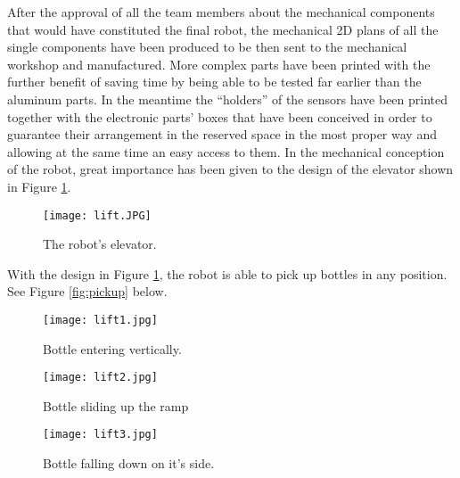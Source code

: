 After the approval of all the team members about the mechanical components that would have constituted the final robot, the mechanical 2D plans of all the single components have been produced to be then sent to the mechanical workshop and manufactured.
More complex parts have been printed with the further benefit of saving time by being able to be tested far earlier than the aluminum parts.
 In the meantime the “holders” of the sensors have been printed together with the electronic parts' boxes that have been conceived in order to guarantee their arrangement in the reserved space in the most proper way and allowing at the same time an easy access to them.
In the mechanical conception of the robot, great importance has been given to the design of the elevator shown in Figure \ref{fig:lift}.

\begin{figure}[H]
 \centering
 \texttt{[image: lift.JPG]}
 \caption{The robot's elevator.}
\label{fig:lift}
\end{figure}

With the design in Figure \ref{fig:lift}, the robot is able to pick up bottles in any position. See Figure \ref{fig:pickup} below.

\begin{minipage}{\linewidth}
      \centering
      \begin{minipage}{0.3\linewidth}
          \begin{figure}[H]
              \texttt{[image: lift1.jpg]}
              \caption{Bottle entering vertically.}
          \end{figure}
      \end{minipage}
      \hspace{0.05\linewidth}
      \begin{minipage}{0.3\linewidth}
          \begin{figure}[H]
              \texttt{[image: lift2.jpg]}
              \caption{Bottle sliding up the ramp}
          \end{figure}
      \end{minipage}
      \hspace{0.05\linewidth}
      \begin{minipage}{0.3\linewidth}
          \begin{figure}[H]
              \texttt{[image: lift3.jpg]}
              \caption{Bottle falling down on it's side.}
          \end{figure}
      \end{minipage}
      \label{fig:pickup}
  \end{minipage}

